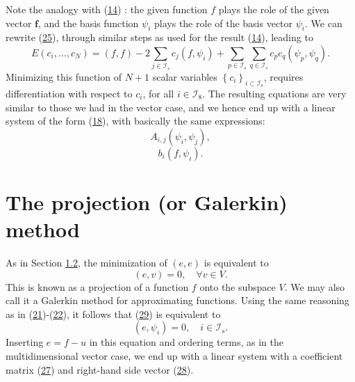 \documentclass[../main.tex]{subfiles}
\begin{document}
\noindent Note the analogy with (\hyperref[eqa14]{14}) : the given function $f$ plays the role of the given vector $\boldsymbol{f}$, and the basis function $\psi_{i}$ plays the role of the basis vector $\psi_{i}$. We can rewrite (\hyperref[eqa25]{25}), through similar steps as used for the result (\hyperref[eqa14]{14}), leading to 
\begin{equation}\label{eqa26}
E\left(c_{i}, \ldots, c_{N}\right)=(f, f)-2 \sum_{j \in \mathcal{I}_{s}} c_{j}\left(f, \psi_{i}\right)+\sum_{p \in \mathcal{I}_{s}} \sum_{q \in \mathcal{I}_{s}} c_{p} c_{q}\left(\psi_{p}, \psi_{q}\right).	
\end{equation}
Minimizing this function of $N+1$ scalar variables $\left\{c_{i}\right\}_{i \subset \mathcal{I}_{\mathrm{s}}}$, requires differentiation with respect to $c_{i}$, for all $i \in \mathcal{I}_{8}$. The resulting cquations are very similar to those we had in the vector case, and we hence end up with a linear system of the form (\hyperref[eqa18]{18}), with basically the same expressions:
\begin{equation}\label{eqa27}
A_{i, j} \left(\psi_{i}, \psi_{j}\right),
\end{equation}
\begin{equation}\label{eqa28}
b_{i} \left(f, \psi_{i}\right).
\end{equation}
\section[The projection (or Galerkin) method]{The projection (or Galerkin) method}
\label{sec:sec_2_2}
As in Section \hyperref[sec:sec_1_2]{1.2}, the minimization of $(e, e)$ is equivalent to
\begin{equation}\label{eqa29}
	(e, v)=0, \quad \forall v \in V.
\end{equation}
This is known as a projection of a function $f$ onto the subspace $V$. We may also call it a Galerkin method for approximating functions. Using the same reasoning as in (\hyperref[eqa21]{21})-(\hyperref[eqa22]{22}), it follows that (\hyperref[eqa29]{29}) is equivalent to
\begin{equation}\label{eqa30}
	\left(e, \psi_{i}\right)=0, \quad i \in \mathcal{I}_{s}.
\end{equation}
Inserting $e=f-u$ in this equation and ordering terms, as in the multidimensional vector case, we end up with a linear system with a coefficient matrix (\hyperref[eqa27]{27}) and right-hand side vector (\hyperref[eqa28]{28}).
\end{document}
